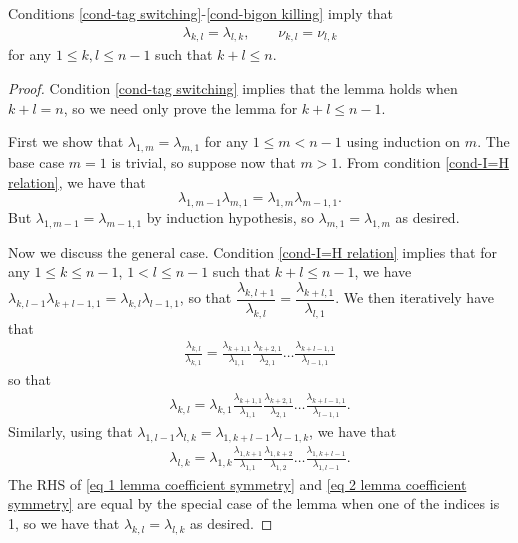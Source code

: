 

\begin{lemma}\label{lemma coefficient symmetry}
   Conditions \cref{cond-tag switching}-\cref{cond-bigon killing} imply that \begin{align*}
       \lambda_{k,l}=\lambda_{l,k}, \quad \quad \nu_{k,l}=\nu_{l,k}
   \end{align*}
   for any $1\leq k,l \leq n-1$ such that $k+l \leq n$.
\end{lemma}
\begin{proof}
    Condition \cref{cond-tag switching} implies that the lemma holds when $k+l=n$, so we  need only prove the lemma for $k+l \leq n-1$.

    First we show that $\lambda_{1,m}=\lambda_{m,1}$ for any $1 \leq m < n-1$ using induction on $m$. 
    The base case $m=1$ is trivial, so suppose now that $m>1$. 
    From condition \cref{cond-I=H relation}, we have that
    $$\lambda_{1,m-1}\lambda_{m,1}=\lambda_{1,m}\lambda_{m-1,1}.$$ 
    But $\lambda_{1,m-1}=\lambda_{m-1,1}$ by induction hypothesis, so $\lambda_{m,1}=\lambda_{1,m}$ as desired.
    
    Now we discuss the general case. 
    Condition \cref{cond-I=H relation} implies that
    for any $1\leq k \leq n-1$, $1<l \leq n-1$ such that $k+l \leq n-1$, we have $\lambda_{k,l-1}\lambda_{k+l-1,1}=\lambda_{k,l}\lambda_{l-1,1}$, so that $\dfrac{\lambda_{k,l+1}}{\lambda_{k,l}}=\dfrac{\lambda_{k+l,1}}{\lambda_{l,1}}$.
    We then iteratively have that
    \begin{align*}
     \frac{\lambda_{k,l}}{\lambda_{k,1}}= \frac{\lambda_{k+1,1}}{\lambda_{1,1}}\frac{\lambda_{k+2,1}}{\lambda_{2,1}}\ldots \frac{\lambda_{k+l-1,1}}{\lambda_{l-1,1}}
    \end{align*}
    so that 
    \begin{align}
    \lambda_{k,l}=\lambda_{k,1}\frac{\lambda_{k+1,1}}{\lambda_{1,1}}\frac{\lambda_{k+2,1}}{\lambda_{2,1}}\ldots \frac{\lambda_{k+l-1,1}}{\lambda_{l-1,1}}.\label{eq 1 lemma coefficient symmetry}
    \end{align}
    Similarly, using that
    $\lambda_{1,l-1}\lambda_{l,k}=\lambda_{1,k+l-1}\lambda_{l-1,k}$, we have that 
    \begin{align}
      \lambda_{l,k} =\lambda_{1,k}\frac{\lambda_{1,k+1}}{\lambda_{1,1}}\frac{\lambda_{1,k+2}}{\lambda_{1,2}}\ldots \frac{\lambda_{1,k+l-1}}{\lambda_{1,l-1}} \label{eq 2 lemma coefficient symmetry}.
    \end{align}
    The RHS of \cref{eq 1 lemma coefficient symmetry} and \cref{eq 2 lemma coefficient symmetry} are equal by the special case of the lemma when one of the indices is 1, so we have that $\lambda_{k,l}=\lambda_{l,k}$ as desired.
\end{proof}

